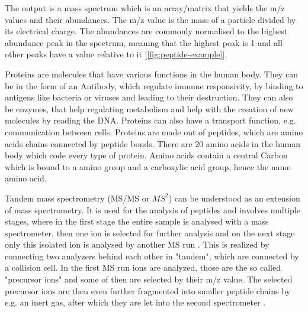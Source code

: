 \documentclass[11pt]{article}
\begin{document}
The output is a mass spectrum which is an array/matrix that yields the m/z values and their abundances. The m/z value is the mass of a particle divided by its electrical charge. The abundances are commonly normalised to the highest abundance peak in the spectrum, meaning that the highest peak is 1 and all other peaks have a value relative to it [\cref{fig:peptide-example}]. 

Proteins are molecules that have various functions in the human body. They can be in the form of an Antibody, which regulate immune responsivity, by binding to antigens like bacteria or viruses and leading to their destruction. They can also be enzymes, that help regulating metabolism and help with the creation of new molecules by reading the DNA. Proteins can also have a transport function, e.g. communication between cells. Proteins are made out of peptides, which are amino acids chains connected by peptide bonds. There are 20 amino acids in the human body which code every type of protein. Amino acids contain a central Carbon which is bound to a amino group and a carboxylic acid group, hence the name amino acid. 

Tandem mass spectrometry (MS/MS or \(MS^2\)) can be understood as an extension of mass spectrometry. It is used for the analysis of peptides and involves multiple stages, where in the first stage the entire sample is analysed with a mass spectrometer, then one ion is selected for further analysis and on the next stage only this isolated ion is analysed by another MS run \cite{tandem-mass-spectrometry}. This is realized by connecting two analyzers behind each other in "tandem", which are connected by a collision cell. In the first MS run ions are analyzed, those are the so called "precursor ions" and some of then are selected by their m/z value. The selected precursor ions are then even further fragmented into smaller peptide chains by e.g. an inert gas, after which they are let into the second spectrometer \cite{tandem-mass-spec-deutsch, tandem-mass-spec-yt}.
\end{document}
